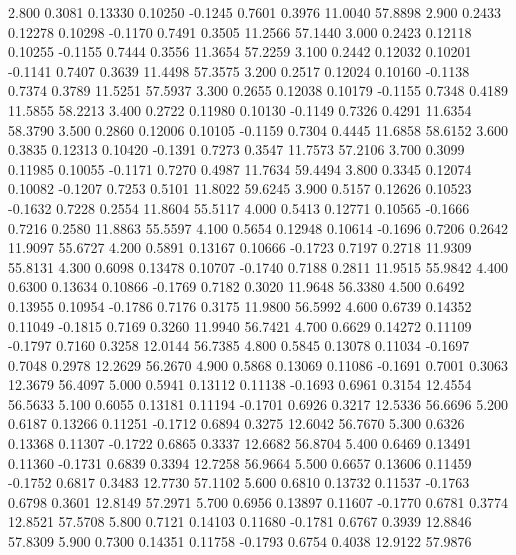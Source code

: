    2.800   0.3081   0.13330   0.10250  -0.1245   0.7601   0.3976  11.0040  57.8898
   2.900   0.2433   0.12278   0.10298  -0.1170   0.7491   0.3505  11.2566  57.1440
   3.000   0.2423   0.12118   0.10255  -0.1155   0.7444   0.3556  11.3654  57.2259
   3.100   0.2442   0.12032   0.10201  -0.1141   0.7407   0.3639  11.4498  57.3575
   3.200   0.2517   0.12024   0.10160  -0.1138   0.7374   0.3789  11.5251  57.5937
   3.300   0.2655   0.12038   0.10179  -0.1155   0.7348   0.4189  11.5855  58.2213
   3.400   0.2722   0.11980   0.10130  -0.1149   0.7326   0.4291  11.6354  58.3790
   3.500   0.2860   0.12006   0.10105  -0.1159   0.7304   0.4445  11.6858  58.6152
   3.600   0.3835   0.12313   0.10420  -0.1391   0.7273   0.3547  11.7573  57.2106
   3.700   0.3099   0.11985   0.10055  -0.1171   0.7270   0.4987  11.7634  59.4494
   3.800   0.3345   0.12074   0.10082  -0.1207   0.7253   0.5101  11.8022  59.6245
   3.900   0.5157   0.12626   0.10523  -0.1632   0.7228   0.2554  11.8604  55.5117
   4.000   0.5413   0.12771   0.10565  -0.1666   0.7216   0.2580  11.8863  55.5597
   4.100   0.5654   0.12948   0.10614  -0.1696   0.7206   0.2642  11.9097  55.6727
   4.200   0.5891   0.13167   0.10666  -0.1723   0.7197   0.2718  11.9309  55.8131
   4.300   0.6098   0.13478   0.10707  -0.1740   0.7188   0.2811  11.9515  55.9842
   4.400   0.6300   0.13634   0.10866  -0.1769   0.7182   0.3020  11.9648  56.3380
   4.500   0.6492   0.13955   0.10954  -0.1786   0.7176   0.3175  11.9800  56.5992
   4.600   0.6739   0.14352   0.11049  -0.1815   0.7169   0.3260  11.9940  56.7421
   4.700   0.6629   0.14272   0.11109  -0.1797   0.7160   0.3258  12.0144  56.7385
   4.800   0.5845   0.13078   0.11034  -0.1697   0.7048   0.2978  12.2629  56.2670
   4.900   0.5868   0.13069   0.11086  -0.1691   0.7001   0.3063  12.3679  56.4097
   5.000   0.5941   0.13112   0.11138  -0.1693   0.6961   0.3154  12.4554  56.5633
   5.100   0.6055   0.13181   0.11194  -0.1701   0.6926   0.3217  12.5336  56.6696
   5.200   0.6187   0.13266   0.11251  -0.1712   0.6894   0.3275  12.6042  56.7670
   5.300   0.6326   0.13368   0.11307  -0.1722   0.6865   0.3337  12.6682  56.8704
   5.400   0.6469   0.13491   0.11360  -0.1731   0.6839   0.3394  12.7258  56.9664
   5.500   0.6657   0.13606   0.11459  -0.1752   0.6817   0.3483  12.7730  57.1102
   5.600   0.6810   0.13732   0.11537  -0.1763   0.6798   0.3601  12.8149  57.2971
   5.700   0.6956   0.13897   0.11607  -0.1770   0.6781   0.3774  12.8521  57.5708
   5.800   0.7121   0.14103   0.11680  -0.1781   0.6767   0.3939  12.8846  57.8309
   5.900   0.7300   0.14351   0.11758  -0.1793   0.6754   0.4038  12.9122  57.9876
